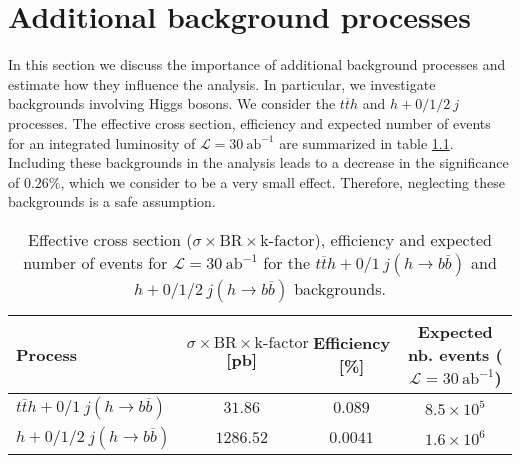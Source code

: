 
\chapter{Additional background processes}
\label{chapter:bkgHiggs}

In this section we discuss the importance of additional background processes and estimate how they influence the analysis. In particular, we investigate backgrounds involving Higgs bosons. We consider the $t\overline{t}h$ and $h+0/1/2~j$ processes. The effective cross section, efficiency and expected number of events for an integrated luminosity of $\mathcal{L}=30~\text{ab}^{-1}$ are summarized in table \ref{table:add_bkg}. Including these backgrounds in the analysis leads to a decrease in the significance of $0.26\%$, which we consider to be a very small effect. Therefore, neglecting these backgrounds is a safe assumption. 

\begin{table}[h]
	\centering
	\caption{Effective cross section ($\sigma\times \text{BR}\times \text{k-factor}$), efficiency and expected number of events for $\mathcal{L}=30~\text{ab}^{-1}$ for the $t\overline{t}h+0/1 ~j(h\rightarrow b\overline{b})$ and $h+0/1/2~j(h\rightarrow b\overline{b})$ backgrounds.}
	\label{table:add_bkg}
	\begin{tabular}{lccc}
		\toprule 
		\textbf{Process} & $\sigma\times \text{BR}\times \text{k-factor}$ [pb]  &  Efficiency [\%] & Expected nb. events ($\mathcal{L}=30~\text{ab}^{-1}$) \\
		\midrule
		\rowcolor{black!7}$t\overline{t}h+0/1 ~j(h\rightarrow b\overline{b})$& $31.86$ & $0.089$ & $8.5\times 10^{5}$\\
		$h+0/1/2~j(h\rightarrow b\overline{b})$& $1286.52$ & $0.0041$ & $1.6\times 10^{6}$\\
		\bottomrule
	\end{tabular}
	
\end{table}

